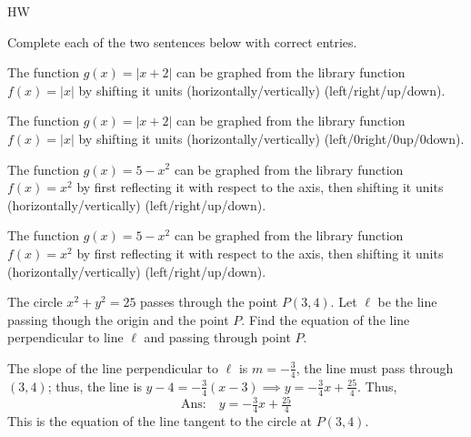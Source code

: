 \documentclass{article}
\begin{document}
\begin{exam}{HW}
\begin{problem*}[3ea]
Complete each of the two sentences below with correct entries.
\begin{parts}
  \item The function $ g(x) = | x+2 | $ can be graphed from the library
  function $ f(x) = |x| $ by shifting it  units
   (horizontally/vertically)  (left/right/up/down).
\ifkeyalt
\begin{solution}[]
    The function $ g(x) = | x+2 | $ can be graphed from the library
    function $ f(x) = |x| $ by shifting it  units
   (horizontally/vertically) 
  (left/\penalty0right/\penalty0up/\penalty0down). %
\end{solution}
\fi
  \item The function $ g(x) = 5 - x^2 $ can be graphed from the library
  function $ f(x) = x^2 $ by first reflecting it with respect to the
   axis, then shifting it  units
   (horizontally/vertically)  (left/right/up/down).
\ifkeyalt
\begin{solution}[]
  The function $ g(x) = 5 - x^2 $ can be graphed from the library function
  $ f(x) = x^2 $ by first reflecting it with respect to the
   axis, then shifting it  units
   (horizontally/vertically)
   (left/right/up/down).
\end{solution}
\fi
\end{parts}
\end{problem*}

\begin{problem}[5]
The circle $ x^2 + y^2 = 25 $ passes through
the point $P(3,4)$.  Let $\ell$ be the line passing though the origin and
the point $P$.  Find the equation of the line perpendicular to line $\ell$ and passing
through point $P$.
\begin{solution}[1in]
The slope of the line perpendicular to $\ell$ is $ m = -\tfrac{3}{4} $, the line
must pass through $(3,4)$; thus, the line is $ y-4 = -\tfrac{3}{4}(x-3) \implies
y = -\tfrac{3}{4} x + \tfrac{25}{4} $. Thus,
\[
    \text{Ans:}\quad\boxed{ y = -\tfrac{3}{4} x + \tfrac{25}{4} }
\]
This is the equation of the line tangent to the circle at $P(3,4)$.
\end{solution}
\end{problem}


\end{exam}
\end{document}
